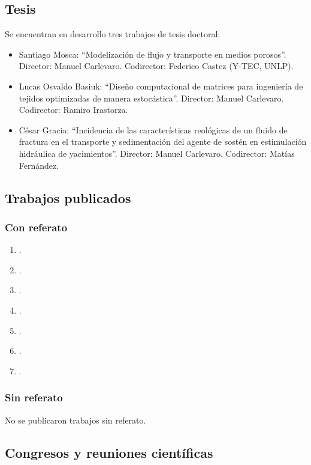 \documentclass[a4paper,11pt,twoside,final,titlepage,onecolumn,openright]{report}
\begin{document}
\subsection{Tesis}

Se encuentran en desarrollo tres trabajos de tesis doctoral:
\begin{itemize}
	\item Santiago Mosca: ``Modelización de flujo y transporte en medios porosos''. Director: Manuel Carlevaro. Codirector: Federico Castez (Y-TEC, UNLP).
	\item Lucas Osvaldo Basiuk: ``Diseño computacional de matrices para ingeniería de tejidos optimizadas de manera estocástica''. Director: Manuel Carlevaro. Codirector: Ramiro Irastorza.
	\item César Gracia: ``Incidencia de las características reológicas de un fluido de fractura en el transporte y sedimentación del agente de sostén en estimulación hidráulica de yacimientos''. Director: Manuel Carlevaro. Codirector: Matías Fernández.
\end{itemize}

\subsection{Trabajos publicados}

\subsubsection{Con referato}

\begin{enumerate}
	\item {}.
	\item {}.
	\item {}.
	\item {}.
	\item {}.
	\item {}.
	\item {}.
\end{enumerate}

\subsubsection{Sin referato}
No se publicaron trabajos sin referato.

\subsection{Congresos y reuniones científicas}
\end{document}
